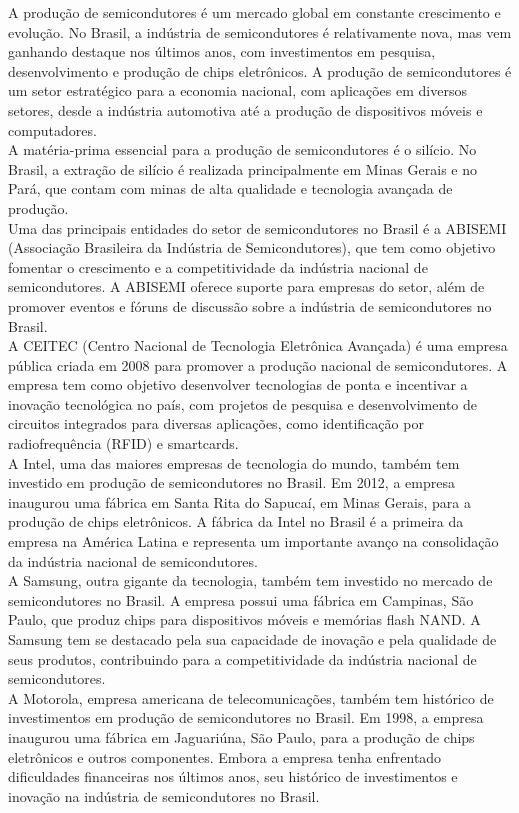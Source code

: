 A produção de semicondutores é um mercado global em constante crescimento e evolução. No Brasil, a indústria de semicondutores é relativamente nova, mas vem ganhando destaque nos últimos anos, com investimentos em pesquisa, desenvolvimento e produção de chips eletrônicos. A produção de semicondutores é um setor estratégico para a economia nacional, com aplicações em diversos setores, desde a indústria automotiva até a produção de dispositivos móveis e computadores.\\
A matéria-prima essencial para a produção de semicondutores é o silício. No Brasil, a extração de silício é realizada principalmente em Minas Gerais e no Pará, que contam com minas de alta qualidade e tecnologia avançada de produção. \\
Uma das principais entidades do setor de semicondutores no Brasil é a ABISEMI (Associação Brasileira da Indústria de Semicondutores), que tem como objetivo fomentar o crescimento e a competitividade da indústria nacional de semicondutores. A ABISEMI oferece suporte para empresas do setor, além de promover eventos e fóruns de discussão sobre a indústria de semicondutores no Brasil.\\
A CEITEC (Centro Nacional de Tecnologia Eletrônica Avançada) é uma empresa pública criada em 2008 para promover a produção nacional de semicondutores. A empresa tem como objetivo desenvolver tecnologias de ponta e incentivar a inovação tecnológica no país, com projetos de pesquisa e desenvolvimento de circuitos integrados para diversas aplicações, como identificação por radiofrequência (RFID) e smartcards.\\
A Intel, uma das maiores empresas de tecnologia do mundo, também tem investido em produção de semicondutores no Brasil. Em 2012, a empresa inaugurou uma fábrica em Santa Rita do Sapucaí, em Minas Gerais, para a produção de chips eletrônicos. A fábrica da Intel no Brasil é a primeira da empresa na América Latina e representa um importante avanço na consolidação da indústria nacional de semicondutores.\\
A Samsung, outra gigante da tecnologia, também tem investido no mercado de semicondutores no Brasil. A empresa possui uma fábrica em Campinas, São Paulo, que produz chips para dispositivos móveis e memórias flash NAND. A Samsung tem se destacado pela sua capacidade de inovação e pela qualidade de seus produtos, contribuindo para a competitividade da indústria nacional de semicondutores.\\
A Motorola, empresa americana de telecomunicações, também tem histórico de investimentos em produção de semicondutores no Brasil. Em 1998, a empresa inaugurou uma fábrica em Jaguariúna, São Paulo, para a produção de chips eletrônicos e outros componentes. Embora a empresa tenha enfrentado dificuldades financeiras nos últimos anos, seu histórico de investimentos e inovação na indústria de semicondutores no Brasil.\\
